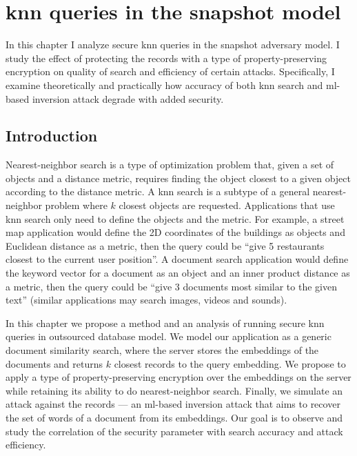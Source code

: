 \chapter{\texorpdfstring{\acrshort{knn}}{kNN} queries in the snapshot model}\label{section:knn-snapshot}
\thispagestyle{myheadings}

	In this chapter I analyze secure \acrshort{knn} queries in the snapshot adversary model.
	I study the effect of protecting the records with a type of property-preserving encryption on quality of search and efficiency of certain attacks.
	Specifically, I examine theoretically and practically how accuracy of both \acrshort{knn} search and \acrshort{ml}-based inversion attack degrade with added security.

	\section{Introduction}

		Nearest-neighbor search is a type of optimization problem that, given a set of objects and a distance metric, requires finding the object closest to a given object according to the distance metric.
		A \acrfull{knn} search is a subtype of a general nearest-neighbor problem where $k$ closest objects are requested.
		Applications that use \acrshort{knn} search only need to define the objects and the metric.
		For example, a street map application would define the 2D coordinates of the buildings as objects and Euclidean distance as a metric, then the query could be ``give 5 restaurants closest to the current user position''.
		A document search application would define the keyword vector for a document as an object and an inner product distance as a metric, then the query could be ``give 3 documents most similar to the given text'' (similar applications may search images, videos and sounds).

		In this chapter we propose a method and an analysis of running secure \acrshort{knn} queries in outsourced database model.
		We model our application as a generic document similarity search, where the server stores the embeddings of the documents and returns $k$ closest records to the query embedding.
		We propose to apply a type of property-preserving encryption over the embeddings on the server while retaining its ability to do nearest-neighbor search.
		Finally, we simulate an attack against the records --- an \acrshort{ml}-based inversion attack that aims to recover the set of words of a document from its embeddings.
		Our goal is to observe and study the correlation of the security parameter with search accuracy and attack efficiency.

